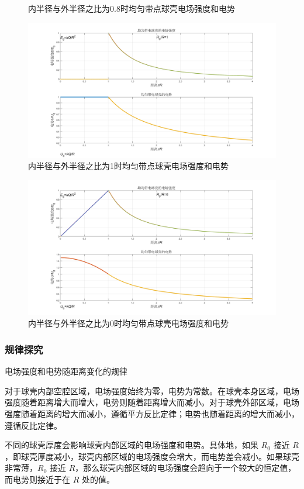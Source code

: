 \documentclass[UTF8]{article}
\numberwithin{figure}{subsection}
\numberwithin{table}{subsection}
\begin{document}
\begin{multicols}{2}
\begin{figure}[H]
		\caption{内半径与外半径之比为0.8时均匀带点球壳电场强度和电势}
	\end{figure}
	\begin{figure}[H]
		\centering
		\includegraphics[scale=0.15]{1.png}
		\caption{内半径与外半径之比为1时均匀带点球壳电场强度和电势}
	\end{figure}
	\begin{figure}[H]
		\centering
		\includegraphics[scale=0.15]{0.png}
		\caption{内半径与外半径之比为0时均匀带点球壳电场强度和电势}
	\end{figure}
	\subsubsection{规律探究}
	\par 电场强度和电势随距离变化的规律
	\par 对于球壳内部空腔区域，电场强度始终为零，电势为常数。在球壳本身区域，电场强度随着距离增大而增大，电势则随着距离增大而减小。对于球壳外部区域，电场强度随着距离的增大而减小，遵循平方反比定律；电势也随着距离的增大而减小，遵循反比定律。
	\par 不同的球壳厚度会影响球壳内部区域的电场强度和电势。具体地，如果 $R_0$ 接近 $R$，即球壳厚度减小，球壳内部区域的电场强度会增大，而电势差会减小。如果球壳非常薄，$R_0$ 接近 $R$，那么球壳内部区域的电场强度会趋向于一个较大的恒定值，而电势则接近于在 $R$ 处的值。

\end{multicols}
\end{document}
